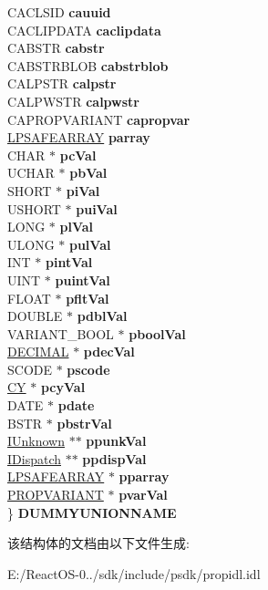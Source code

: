\begin{DoxyCompactItemize}
\begin{tabbing}
\>CACLSID {\bfseries cauuid}\\
\>CACLIPDATA {\bfseries caclipdata}\\
\>CABSTR {\bfseries cabstr}\\
\>CABSTRBLOB {\bfseries cabstrblob}\\
\>CALPSTR {\bfseries calpstr}\\
\>CALPWSTR {\bfseries calpwstr}\\
\>CAPROPVARIANT {\bfseries capropvar}\\
\>\hyperlink{structtag_s_a_f_e_a_r_r_a_y}{LPSAFEARRAY} {\bfseries parray}\\
\>CHAR $\ast$ {\bfseries pcVal}\\
\>UCHAR $\ast$ {\bfseries pbVal}\\
\>SHORT $\ast$ {\bfseries piVal}\\
\>USHORT $\ast$ {\bfseries puiVal}\\
\>LONG $\ast$ {\bfseries plVal}\\
\>ULONG $\ast$ {\bfseries pulVal}\\
\>INT $\ast$ {\bfseries pintVal}\\
\>UINT $\ast$ {\bfseries puintVal}\\
\>FLOAT $\ast$ {\bfseries pfltVal}\\
\>DOUBLE $\ast$ {\bfseries pdblVal}\\
\>VARIANT\_BOOL $\ast$ {\bfseries pboolVal}\\
\>\hyperlink{structtag_d_e_c}{DECIMAL} $\ast$ {\bfseries pdecVal}\\
\>SCODE $\ast$ {\bfseries pscode}\\
\>\hyperlink{uniontag_c_y}{CY} $\ast$ {\bfseries pcyVal}\\
\>DATE $\ast$ {\bfseries pdate}\\
\>BSTR $\ast$ {\bfseries pbstrVal}\\
\>\hyperlink{interface_i_unknown}{IUnknown} $\ast$$\ast$ {\bfseries ppunkVal}\\
\>\hyperlink{interface_i_dispatch}{IDispatch} $\ast$$\ast$ {\bfseries ppdispVal}\\
\>\hyperlink{structtag_s_a_f_e_a_r_r_a_y}{LPSAFEARRAY} $\ast$ {\bfseries pparray}\\
\>\hyperlink{struct_i_property_storage_1_1tag_p_r_o_p_v_a_r_i_a_n_t}{PROPVARIANT} $\ast$ {\bfseries pvarVal}\\
\} {\bfseries DUMMYUNIONNAME}\\

\end{tabbing}\end{DoxyCompactItemize}


该结构体的文档由以下文件生成\+:\begin{DoxyCompactItemize}
\item 
E\+:/\+React\+O\+S-\/0../sdk/include/psdk/propidl.\+idl\end{DoxyCompactItemize}
